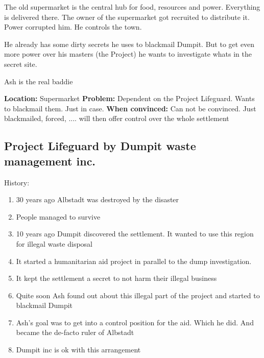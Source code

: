 \begin{npcBox}[title=Ash]
    \begin{consequences}
    \item {}
    \item {}
    \item {}
    \end{consequences}
    
    \begin{npcDescription}
    The old supermarket is the central hub for food, resources and power. Everything is delivered there. The owner of the supermarket got recruited to distribute it. Power corrupted him. He controls the town.

    He already has some dirty secrets he uses to blackmail Dumpit. But to get even more power over his masters (the Project) he wants to investigate whats in the secret site.
    
    Ash is the real baddie

    \textbf{Location:} Supermarket
    \textbf{Problem:} Dependent on the Project Lifeguard. Wants to blackmail them. Just in case.
    \textbf{When convinced:} Can not be convinced. Just blackmailed, forced, .... will then offer control over the whole settlement
    \end{npcDescription}
    
\end{npcBox}




\subsection{Project Lifeguard by Dumpit waste management inc.}

History:
\begin{enumerate}
    \item 30 years ago Albstadt was destroyed by the disaster
    \item People managed to survive
    \item 10 years ago Dumpit discovered the settlement. It wanted to use this region for illegal waste disposal
    \item It started a humanitarian aid project in parallel to the dump investigation.
    \item It kept the settlement a secret to not harm their illegal business
    \item Quite soon Ash found out about this illegal part of the project and started to blackmail Dumpit
    \item Ash's goal was to get into a control position for the aid. Which he did. And became the de-facto ruler of Albstadt
    \item Dumpit inc is ok with this arrangement
\end{enumerate}

